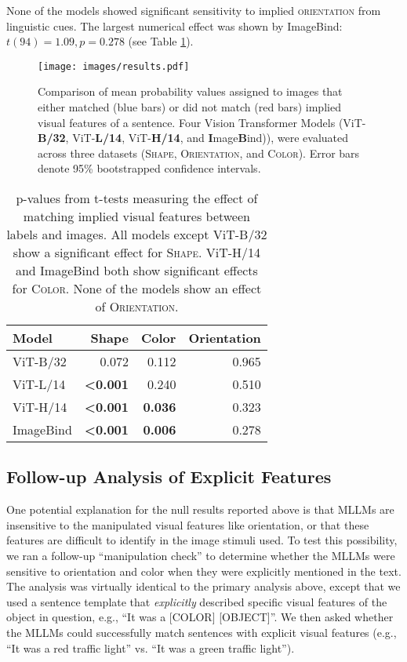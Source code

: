\documentclass[10pt, a4paper]{article}
\begin{document}
None of the models showed significant sensitivity to implied \textsc{orientation} from linguistic cues. The largest numerical effect was shown by ImageBind: $t(94) = 1.09, p = 0.278$ (see Table \ref{tab:results}).

\begin{figure*}[ht]
    \texttt{[image: images/results.pdf]}
    \label{fig:results}
    \caption{Comparison of mean probability values assigned to images that either matched (blue bars) or did not match (red bars) implied visual features of a sentence. Four Vision Transformer Models (ViT-\textbf{B/32}, ViT-\textbf{L/14}, ViT-\textbf{H/14}, and \textbf{I}mage\textbf{B}ind)), were evaluated across three datasets (\textsc{Shape}, \textsc{Orientation}, and \textsc{Color}). Error bars denote 95\% bootstrapped confidence intervals.}

\end{figure*}

\begin{table}[ht]
\label{tab:results}
\centering
\begin{tabular}{lrrr}
  \hline
Model & Shape & Color & Orientation \\ 
  \hline
ViT-B/32 & 0.072 & 0.112 & 0.965 \\ 
  ViT-L/14 & \textbf{<0.001} & 0.240 & 0.510 \\ 
  ViT-H/14 & \textbf{<0.001} & \textbf{0.036} & 0.323 \\ 
  ImageBind & \textbf{<0.001} & \textbf{0.006} & 0.278 \\ 
   \hline
\end{tabular}
\caption{p-values from t-tests measuring the effect of matching implied visual features between labels and images. All models except ViT-B/32 show a significant effect for \textsc{Shape}. ViT-H/14 and ImageBind both show significant effects for \textsc{Color}. None of the models show an effect of \textsc{Orientation}.} 
\end{table}


\subsection{Follow-up Analysis of Explicit Features}\label{sec:followup}

One potential explanation for the null results reported above is that MLLMs are insensitive to the manipulated visual features like orientation, or that these features are difficult to identify in the image stimuli used.
To test this possibility, we ran a follow-up ``manipulation check'' to determine whether the MLLMs were sensitive to orientation and color when they were explicitly mentioned in the text. The analysis was virtually identical to the primary analysis above, except that we used a sentence template that \textit{explicitly} described specific visual features of the object in question, e.g., ``It was a [COLOR] [OBJECT]''. We then asked whether the MLLMs could successfully match sentences with explicit visual features (e.g., ``It was a red traffic light'' vs. ``It was a green traffic light'').
\end{document}
